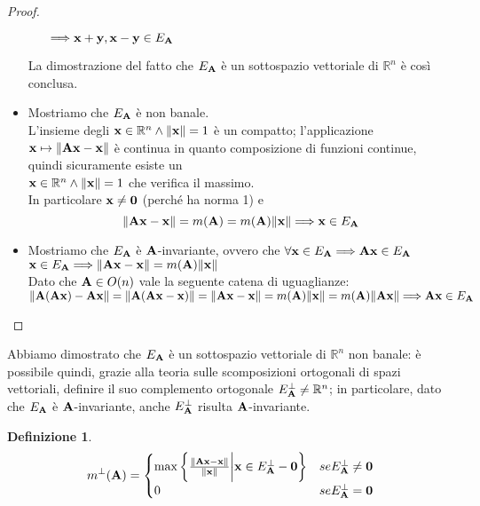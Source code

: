 \documentclass[a4paper,11pt,openright,twoside	]{book}
\newtheorem{definition}{Definizione}[section]
\begin{document}
\begin{proof}
\begin{itemize}
\begin{itemize}
$\Longrightarrow \vb{x+y, x-y} \in E_{\vb{A}} $ 
\end{itemize}  
La dimostrazione del fatto che $E_{\vb{A}}$ è un sottospazio vettoriale di $\mathbb{R}^n $ è così conclusa.
\item Mostriamo che $E_{\vb{A}}$ è non banale.\\
L'insieme degli $\vb{x} \in \mathbb{R}^{n} \land \norm{\vb{x}} = 1$ è un compatto; l'applicazione $ \vb{x} \mapsto \norm{\vb{Ax-x}}$ è continua in quanto composizione di funzioni continue, quindi sicuramente esiste un \\ $\vb{x} \in \mathbb{R}^{n} \land \norm{\vb{x}} = 1$  che  verifica il massimo. \\
In particolare $\vb{x} \neq \vb{0}$  (perché ha norma 1) e 
\[ \norm{\vb{Ax - x}} = m(\vb{A}) = m(\vb{A})\norm{\vb{x}} \Longrightarrow \vb{x} \in E_{\vb{A}}\]
\item Mostriamo che $E_{\vb{A}}$ è $\vb{A}$-invariante, ovvero che  $\forall \vb{x} \in E_{\vb{A}} \Longrightarrow \vb{Ax} \in E_{\vb{A}}$ \\
$\vb{x} \in E_{\vb{A}} \Longrightarrow \norm{\vb{Ax-x}} = m(\vb{A})\norm{\vb{x}} $ \\
Dato che $\vb{A} \in O(n)$ vale la seguente catena di uguaglianze:\\
$ \norm{\vb{A(Ax) - Ax }} =  \norm{\vb{A(Ax-x)}} = \norm{\vb{Ax - x}} = m(\vb{A})\norm{\vb{x}} = m(\vb{A})\norm{\vb{Ax}} \Longrightarrow \vb{Ax} \in E_{\vb{A}}$
\end{itemize} 
\end{proof}
Abbiamo dimostrato che $E_{\vb{A}}$ è un sottospazio vettoriale di $\mathbb{R}^n $ non banale: è possibile quindi, grazie alla teoria sulle scomposizioni ortogonali di spazi vettoriali, definire il suo complemento ortogonale $E^{\perp}_{\vb{A}} \neq \mathbb{R}^n$;  in particolare, dato che $E_{\vb{A}}$ è $\vb{A}$-invariante, anche $E^{\perp}_{\vb{A}}$ risulta $\vb{A}$-invariante. 


\begin{definition}

\[ m^{\perp}(\vb{A}) = \begin{cases} 
      \max \bigg\{ \frac{\norm{\vb{Ax-x}}}{\norm{\vb{x}}} \bigg|  \vb{x} \in E^{\perp}_{\vb{A}} - \vb{0} \bigg\}  &  se   E^{\perp}_{\vb{A}} \neq {\vb{0}} \\
      0 & se   E^{\perp}_{\vb{A}} = {\vb{0}} \\
      
   \end{cases}
\]

\end{definition}
\end{document}
